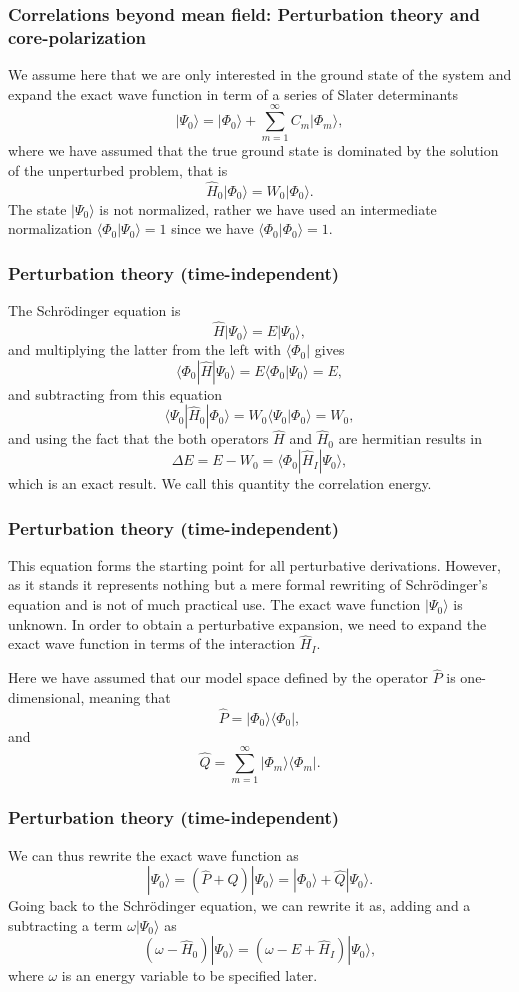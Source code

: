 \documentclass[compress]{beamer}
\begin{document}
\frame
{
\frametitle{Correlations beyond mean field: Perturbation theory and core-polarization}
\begin{small}
{\scriptsize
We assume here that we are only interested in the ground state of the system and 
expand the exact wave function in term of a series of Slater determinants
\[
|\Psi_0\rangle = |\Phi_0\rangle + \sum_{m=1}^{\infty}C_m|\Phi_m\rangle,
\]
where we have assumed that the true ground state is dominated by the 
solution of the unperturbed problem, that is
\[
\hat{H}_0|\Phi_0\rangle= W_0|\Phi_0\rangle.
\]
The state $|\Psi_0\rangle$ is not normalized, rather we have used an intermediate 
normalization $\langle \Phi_0 |\Psi_0\rangle=1$ since we have $\langle \Phi_0|\Phi_0\rangle=1$. 
}
\end{small}
}


\frame
{
\frametitle{Perturbation theory (time-independent)}
\begin{small}
{\scriptsize
The Schr\"odinger equation is
\[
\hat{H}|\Psi_0\rangle = E|\Psi_0\rangle,
\]
and multiplying the latter from the left with $\langle \Phi_0|$ gives
\[
\langle \Phi_0|\hat{H}|\Psi_0\rangle = E\langle \Phi_0|\Psi_0\rangle=E,
\]
and subtracting from this equation
\[
\langle \Psi_0|\hat{H}_0|\Phi_0\rangle= W_0\langle \Psi_0|\Phi_0\rangle=W_0,
\]
and using the fact that the both operators $\hat{H}$ and $\hat{H}_0$ are hermitian 
results in
\[
\Delta E=E-W_0=\langle \Phi_0|\hat{H}_I|\Psi_0\rangle,
\]
which is an exact result. We call this quantity the correlation energy.
}
\end{small}
}


\frame
{
\frametitle{Perturbation theory (time-independent)}
\begin{small}
{\scriptsize
This equation forms the starting point for all perturbative derivations. However,
as it stands it represents nothing but a mere formal rewriting of Schr\"odinger's equation and is not of much practical use. The exact wave function $|\Psi_0\rangle$ is unknown. In order to obtain a perturbative expansion, we need to expand the exact wave function in terms of the interaction $\hat{H}_I$. 

Here we have assumed that our model space defined by the operator $\hat{P}$ is one-dimensional, meaning that
\[
\hat{P}= |\Phi_0\rangle \langle \Phi_0|,
\]
and 
\[
\hat{Q}=\sum_{m=1}^{\infty}|\Phi_m\rangle \langle \Phi_m|.
\]
}
\end{small}
}


\frame
{
\frametitle{Perturbation theory (time-independent)}
\begin{small}
{\scriptsize
We can thus rewrite the exact wave function as
\[
|\Psi_0\rangle= (\hat{P}+\hat{Q})|\Psi_0\rangle=|\Phi_0\rangle+\hat{Q}|\Psi_0\rangle.
\]
Going back to the Schr\"odinger equation, we can rewrite it as, adding and a subtracting a term $\omega |\Psi_0\rangle$ as
\[
\left(\omega-\hat{H}_0\right)|\Psi_0\rangle=\left(\omega-E+\hat{H}_I\right)|\Psi_0\rangle,
\]
where $\omega$ is an energy variable to be specified later. 
}
\end{small}
}
\end{document}
